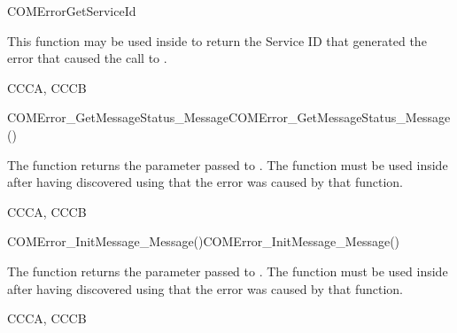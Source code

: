 
\begin{function_nopb2}{COMErrorGetServiceId}
  \begin{fundescription}
    This function may be used inside  to return the
    Service ID that generated the error that caused the call to
    . 
  \end{fundescription}
  \begin{funreturn}
  \end{funreturn}
  \begin{funconformance}
    CCCA, CCCB
  \end{funconformance}
\end{function_nopb2}



\begin{function_nopb2}{COMError\_GetMessageStatus\_Message}{COMError_GetMessageStatus_Message()}
  \begin{fundescription}
    The function returns the  parameter passed to
    . The function must be used inside  
     after having discovered using  that the error 
     was caused by that function.
  \end{fundescription}
  \begin{funreturn}
  \end{funreturn}
  \begin{funconformance}
   CCCA, CCCB
  \end{funconformance}
\end{function_nopb2}

\begin{function_nopb2}{COMError\_InitMessage\_Message()}{COMError_InitMessage_Message()}
  \begin{fundescription}
    The function returns the  parameter passed to
    . The function must be used inside  
     after having discovered using  that the error 
     was caused by that function.
  \end{fundescription}
  \begin{funreturn}
  \end{funreturn}
  \begin{funconformance}
   CCCA, CCCB
  \end{funconformance}
\end{function_nopb2}

